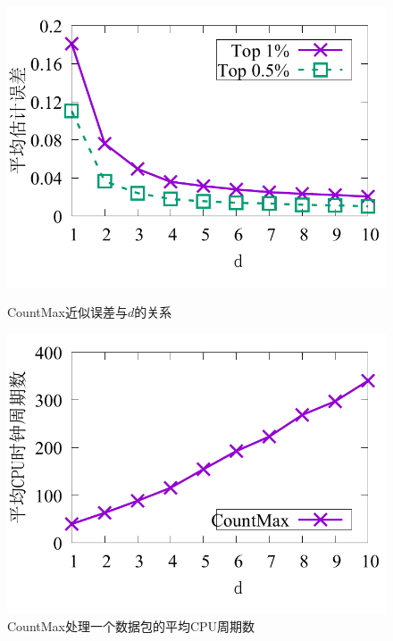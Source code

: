 \begin{figure}[h]
	\centering
	\begin{minipage}[t]{0.48\linewidth}		
		\centering
		\includegraphics[width=\linewidth]{fig/cm_d_err.pdf}
		\caption{\textnormal{CountMax近似误差与$d$的关系}}
		\label{fig:cm,d,acc}
	\end{minipage}\vspace{-0.6em}
\hspace{0.4em}
	\begin{minipage}[t]{0.48\linewidth}
        \centering
		\includegraphics[width=\linewidth]{fig/cm_d_cpu.pdf}
		\caption{\textnormal{CountMax处理一个数据包的平均CPU周期数}}
		\label{fig:cm,d,cpu}
	\end{minipage}\vspace{-0.6em}
\hspace{0.1em}
\end{figure}

